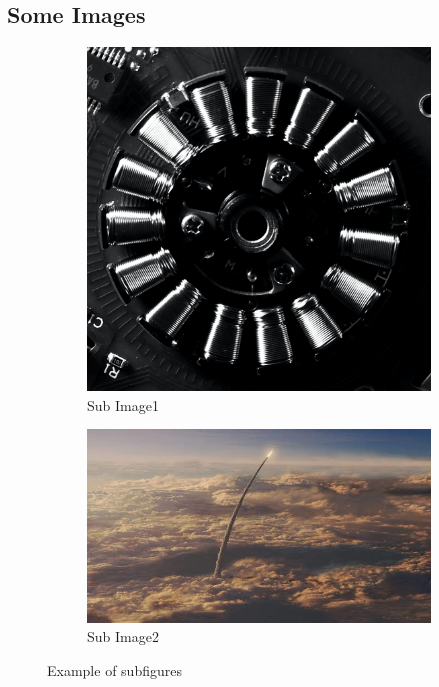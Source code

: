 \documentclass[../article.tex]{subfiles}
\begin{document}
\subsection{Some Images}

\begin{figure}[H]
	\centering
	\hfill
	\begin{subfigure}[b]{0.4\textwidth}
		\centering
		\includegraphics[width=\textwidth]{../images/image}
		\caption{\small Sub Image1}
	\end{subfigure}
	\hfill
	\begin{subfigure}[b]{0.4\textwidth}
		\centering
		\includegraphics[width=\textwidth]{../images/image2}
		\caption{\small Sub Image2}
	\end{subfigure}
	\hfill
	\caption{Example of subfigures}
\end{figure}

\validinsub{}
\end{document}
